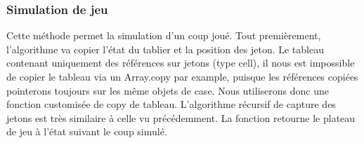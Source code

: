 \documentclass[11pt]{article}
\begin{document}
\subsubsection{Simulation de jeu}

Cette méthode permet la simulation d'un coup joué. Tout premièrement, l'algorithme va copier l'état du tablier et la position des jeton. Le tableau contenant uniquement des références sur jetons (type cell), il nous est impossible de copier le tableau via un Array.copy par example, puisque les références copiées pointerons toujours sur les même objets de case. Nous  utiliserons donc une fonction customisée de copy de tableau. L'algorithme récursif de capture des jetons est très similaire à celle vu précédemment. La fonction retourne le plateau de jeu à l'état suivant le coup simulé.
\end{document}
